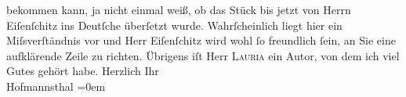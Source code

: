 \begin{ledgroupsized}[t]{13cm}
               bekommen kann, ja nicht einmal {\pb}weiß, ob das Stück bis jetzt \introOben{}von Herrn Eiſenſchitz\introOben{} ins Deutſche überſetzt wurde.\pend
           \pstart
           Wahrſcheinlich liegt hier ein Miſsverſtändnis vor und Herr Eiſenſchitz wird wohl ſo freundlich ſein, an Sie eine
               aufklärende Zeile zu richten. Übrigens iſt Herr \textsc{Lauria} ein {\pb}Autor, von dem ich viel
               Gutes gehört habe.\pend
           \pstart
           Herzlich Ihr{\\[\baselineskip]}\spacefill\mbox{Hofmannsthal}\pend
           \leftskip=0em{}
         
         \endnumbering{}\end{ledgroupsized}  \newcommand{\dateiname}{L00865}\newcommand{\titel}{Hugo von Hofmannsthal an Arthur Schnitzler, 3. 12. 1898}\newcommand{\editorInnen}{Martin Anton Müller und Gerd-Hermann Susen}
      
